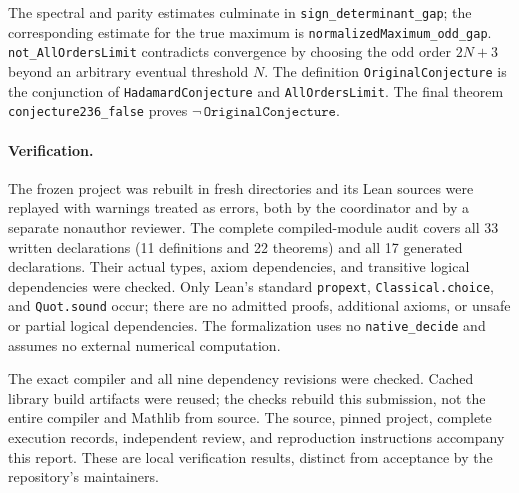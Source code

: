 \documentclass[11pt]{article}
\begin{document}
The spectral and parity estimates culminate in
\texttt{sign\_determinant\_gap}; the corresponding estimate for the true
maximum is \texttt{normalizedMaximum\_odd\_gap}.
\texttt{not\_AllOrdersLimit} contradicts convergence by choosing the odd
order $2N+3$ beyond an arbitrary eventual threshold $N$.
The definition \texttt{OriginalConjecture} is the conjunction of
\texttt{HadamardConjecture} and \texttt{AllOrdersLimit}. The final theorem
\texttt{conjecture236\_false} proves $\neg\,\texttt{OriginalConjecture}$.

\paragraph{Verification.}
The frozen project was rebuilt in fresh directories and its Lean sources
were replayed with warnings treated as errors, both by the coordinator
and by a separate nonauthor reviewer. The complete compiled-module audit
covers all 33 written declarations (11 definitions and 22 theorems) and
all 17 generated declarations. Their actual types, axiom dependencies,
and transitive logical dependencies were checked. Only Lean's standard
\texttt{propext}, \texttt{Classical.choice}, and \texttt{Quot.sound}
occur; there are no admitted proofs, additional axioms, or unsafe or
partial logical dependencies. The formalization uses no
\texttt{native\_decide} and assumes no external numerical computation.

The exact compiler and all nine dependency revisions were checked.
Cached library build artifacts were reused; the checks rebuild this
submission, not the entire compiler and Mathlib from source.
The source, pinned project, complete execution records, independent
review, and reproduction instructions accompany this report. These are
local verification results, distinct from acceptance by the repository's
maintainers.
\end{document}
